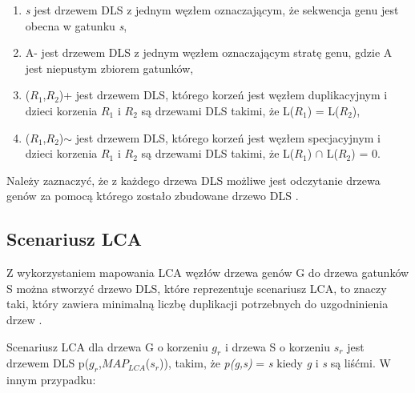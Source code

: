 \documentclass[licencjacka]{pracamgr}
\begin{document}
\begin{enumerate}
\item \textit{s} jest drzewem DLS z jednym węzłem oznaczającym, że sekwencja genu jest obecna w gatunku \textit{s},
\item  A- jest drzewem DLS z jednym węzłem oznaczającym stratę genu, gdzie A jest niepustym zbiorem gatunków,
\item ($R_1$,$R_2$)+ jest drzewem DLS, którego korzeń jest węzłem duplikacyjnym i dzieci korzenia $R_1$ i $R_2$ są drzewami DLS takimi, że L($R_1$) = L($R_2$),
\item ($R_1$,$R_2$)$\sim$ jest drzewem DLS, którego korzeń jest węzłem specjacyjnym i dzieci korzenia $R_1$ i $R_2$ są drzewami DLS takimi, że L($R_1$) $\cap$ L($R_2$) = 0.
\end{enumerate}

Należy zaznaczyć, że z każdego drzewa DLS możliwe jest odczytanie drzewa genów za pomocą którego zostało zbudowane drzewo DLS \cite{dls}.


\subsection{Scenariusz LCA}

Z wykorzystaniem mapowania LCA węzłów drzewa genów G do drzewa gatunków S można stworzyć drzewo DLS, które reprezentuje scenariusz LCA, to znaczy taki, który zawiera minimalną liczbę duplikacji potrzebnych do uzgodninienia drzew \cite{dowod}.

Scenariusz LCA dla drzewa G o korzeniu $g_r$ i drzewa S o korzeniu $s_r$ jest drzewem DLS p($g_r$,$MAP_{LCA}$($s_r$)), takim, że \textit{p(g,s)} = \textit{s} kiedy \textit{g} i \textit{s} są liśćmi. W innym przypadku:
\end{document}
